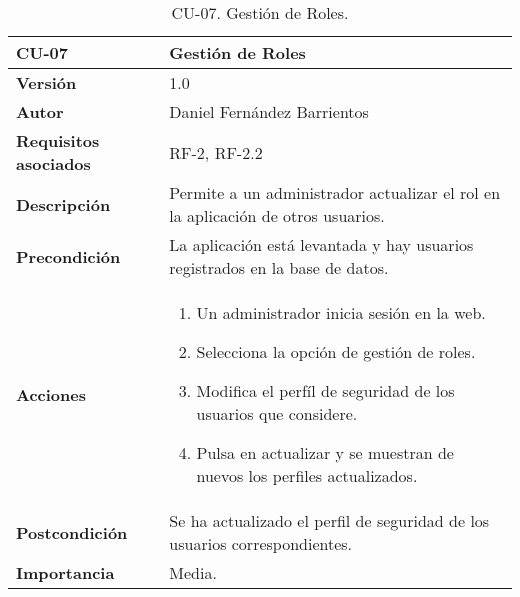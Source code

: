 \begin{table}[p]
	\centering
	\begin{tabularx}{\linewidth}{ p{} p{} }
		\toprule
		\textbf{CU-07}    & \textbf{Gestión de Roles}\\
		\toprule
		\textbf{Versión}              & 1.0    \\
		\textbf{Autor}                & Daniel Fernández Barrientos \\
		\textbf{Requisitos asociados} & RF-2, RF-2.2 \\
		\textbf{Descripción}          & Permite a un administrador actualizar el rol en la aplicación de otros usuarios. \\
		\textbf{Precondición}         & La aplicación está levantada y hay usuarios registrados en la base de datos. \\
		\textbf{Acciones}             &
		\begin{enumerate}
			\def\labelenumi{\arabic{enumi}.}
			\tightlist
			\item Un administrador inicia sesión en la web.
			\item Selecciona la opción de gestión de roles.
			\item Modifica el perfíl de seguridad de los usuarios que considere.
			\item Pulsa en actualizar y se muestran de nuevos los perfiles actualizados.
		\end{enumerate}\\
		\textbf{Postcondición}        & Se ha actualizado el perfil de seguridad de los usuarios correspondientes. \\
		\textbf{Importancia}          & Media. \\
		\bottomrule
	\end{tabularx}
	\caption{CU-07. Gestión de Roles.}
\end{table}

